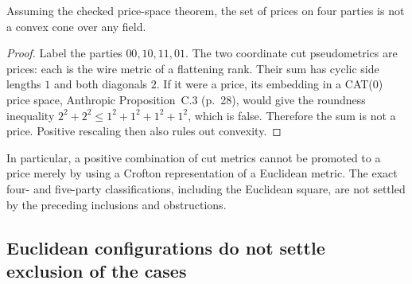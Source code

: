 \begin{proposition}
\label{pg:nonconvex}
Assuming the checked price-space theorem, the set of prices on four parties
is not a convex cone over any field.
\end{proposition}
\begin{proof}
Label the parties $00,10,11,01$. The two coordinate cut pseudometrics are
prices: each is the wire metric of a flattening rank. Their sum has cyclic
side lengths $1$ and both diagonals $2$. If it were a price, its embedding
in a CAT(0) price space, Anthropic Proposition~C.3 (p.~28), would give
the roundness inequality
$2^2+2^2\leq1^2+1^2+1^2+1^2$, which is false. Therefore the sum is
not a price. Positive rescaling then also rules out convexity.
\end{proof}

In particular, a positive combination of cut metrics cannot be promoted to
a price merely by using a Crofton representation of a Euclidean metric.
The exact four- and five-party classifications, including the Euclidean
square, are not settled by the preceding inclusions and obstructions.

\subsection{Euclidean configurations do not settle exclusion of the cases}

